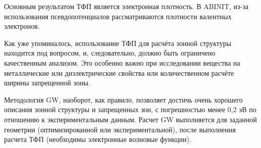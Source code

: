 Основным результатом ТФП является электронная плотность. В ABINIT, из-за использования псевдопотенциалов рассматриваются плотности валентных электронов. 

Как уже упоминалось, использование ТФП для расчёта зонной структуры находится под вопросом, и, следовательно, должно быть ограничено качественным анализом. Это особенно важно при исследовании вещества на металлические или диэлектрические свойства или количественном расчёте ширины запрещенной зоны.

Методология GW, наоборот, как правило, позволяет достичь очень хорошего описания зонной структуры и запрещенных зон, с погрешностью менее 0,2 эВ по отношению к экспериментальным данным. Расчет GW выполняется для заданной геометрии (оптимизированной или экспериментальной), после выполнения расчета ТФП (необходимы электронные волновые функции).\cite{abinit}
